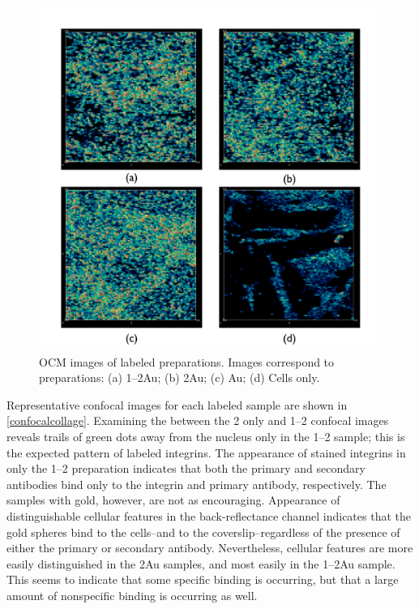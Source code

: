 \begin{figure}[p]
\centering
\includegraphics[keepaspectratio,width=\textwidth,height=0.75\textheight]{6marocmreprimages.pdf}
\caption{OCM images of labeled preparations. Images correspond to preparations: (a) 1--2Au; (b) 2Au; (c) Au; (d) Cells only.}
\label{marocmcollage}
\end{figure}

Representative confocal images for each labeled sample are shown in \autoref{confocalcollage}. Examining the between the 2 only and 1--2 confocal images reveals trails of green dots away from the nucleus only in the 1--2 sample; this is the expected pattern of labeled integrins. The appearance of stained integrins in only the 1--2 preparation indicates that both the primary and secondary antibodies bind only to the integrin and primary antibody, respectively. The samples with gold, however, are not as encouraging. Appearance of distinguishable cellular features in the back-reflectance channel indicates that the gold spheres bind to the cells--and to the coverslip--regardless of the presence of either the primary or secondary antibody. Nevertheless, cellular features are more easily distinguished in the 2Au samples, and most easily in the 1--2Au sample. This seems to indicate that some specific binding is occurring, but that a large amount of nonspecific binding is occurring as well.

